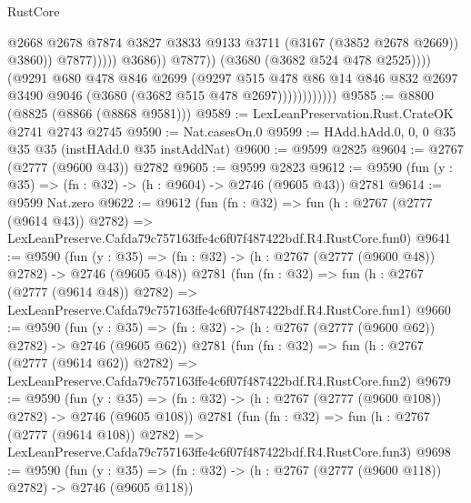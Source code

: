 \begin{lexlean}{RustCore}
\begin{coremodule}
                                              @2668
                                              @2678
                                              @7874
                                              @3827
                                              @3833
                                              @9133
                                              @3711
                                              (@3167 (@3852 @2678 @2669))
                                              @3860))
                                          @7877)))))
                                @3686))
                            @7877))
                        (@3680 (@3682 @524 @478 @2525))))
                    (@9291
                      @680
                      @478
                      @846
                      @2699
                      (@9297
                        @515
                        @478
                        @86
                        @14
                        @846
                        @832
                        @2697
                        @3490
                        @9046
                        (@3680 (@3682 @515 @478 @2697))))))))))))
@9585 := @8800 (@8825 (@8866 (@8868 @9581)))
@9589 := LexLeanPreservation.Rust.CrateOK @2741 @2743 @2745
@9590 := Nat.casesOn.{0}
@9599 := HAdd.hAdd.{0, 0, 0} @35 @35 @35 (instHAdd.{0} @35 instAddNat)
@9600 := @9599 @2825
@9604 := @2767 (@2777 (@9600 @43)) @2782
@9605 := @9599 @2823
@9612 := @9590 (fun (y : @35) => (fn : @32) -> (h : @9604) -> @2746 (@9605 @43)) @2781
@9614 := @9599 Nat.zero
@9622 := @9612
    (fun (fn : @32) =>
    fun (h : @2767 (@2777 (@9614 @43)) @2782) =>
    LexLeanPreserve.Cafda79c757163ffe4c6f07f487422bdf.R4.RustCore.fun0)
@9641 := @9590
    (fun (y : @35) => (fn : @32) -> (h : @2767 (@2777 (@9600 @48)) @2782) -> @2746 (@9605 @48))
    @2781
    (fun (fn : @32) =>
    fun (h : @2767 (@2777 (@9614 @48)) @2782) =>
    LexLeanPreserve.Cafda79c757163ffe4c6f07f487422bdf.R4.RustCore.fun1)
@9660 := @9590
    (fun (y : @35) => (fn : @32) -> (h : @2767 (@2777 (@9600 @62)) @2782) -> @2746 (@9605 @62))
    @2781
    (fun (fn : @32) =>
    fun (h : @2767 (@2777 (@9614 @62)) @2782) =>
    LexLeanPreserve.Cafda79c757163ffe4c6f07f487422bdf.R4.RustCore.fun2)
@9679 := @9590
    (fun (y : @35) => (fn : @32) -> (h : @2767 (@2777 (@9600 @108)) @2782) -> @2746 (@9605 @108))
    @2781
    (fun (fn : @32) =>
    fun (h : @2767 (@2777 (@9614 @108)) @2782) =>
    LexLeanPreserve.Cafda79c757163ffe4c6f07f487422bdf.R4.RustCore.fun3)
@9698 := @9590
    (fun (y : @35) => (fn : @32) -> (h : @2767 (@2777 (@9600 @118)) @2782) -> @2746 (@9605 @118))

\end{coremodule}
\end{lexlean}
